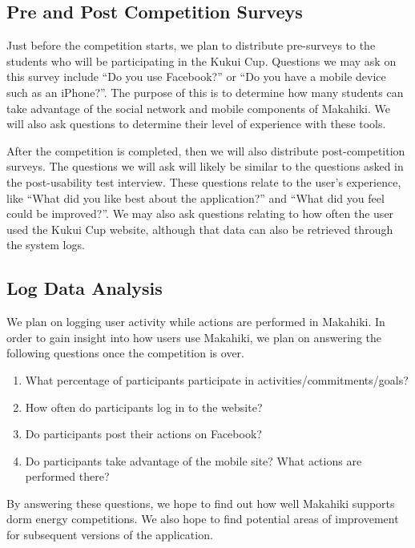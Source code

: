 \subsection{Pre and Post Competition Surveys}
\label{surveys}

Just before the competition starts, we plan to distribute pre-surveys to the students who will be participating in the Kukui Cup.  Questions we may ask on this survey include ``Do you use Facebook?'' or ``Do you have a mobile device such as an iPhone?''.  The purpose of this is to determine how many students can take advantage of the social network and mobile components of Makahiki.  We will also ask questions to determine their level of experience with these tools.

After the competition is completed, then we will also distribute post-competition surveys.  The questions we will ask will likely be similar to the questions asked in the post-usability test interview.  These questions relate to the user's experience, like ``What did you like best about the application?'' and ``What did you feel could be improved?''.  We may also ask questions relating to how often the user used the Kukui Cup website, although that data can also be retrieved through the system logs.

\subsection{Log Data Analysis}
\label{logdata}

We plan on logging user activity while actions are performed in Makahiki.  In order to gain insight into how users use Makahiki, we plan on answering the following questions once the competition is over.

\begin{enumerate}
	\item What percentage of participants participate in activities/commitments/goals?
	\item How often do participants log in to the website?
	\item Do participants post their actions on Facebook?
	\item Do participants take advantage of the mobile site?  What actions are performed there?
\end{enumerate}

By answering these questions, we hope to find out how well Makahiki supports dorm energy competitions.  We also hope to find potential areas of improvement for subsequent versions of the application.

